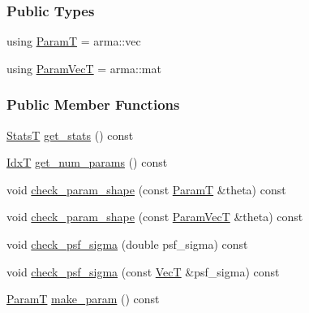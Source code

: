 \subsubsection*{Public Types}
\begin{DoxyCompactItemize}
\item 
using \hyperlink{classmappel_1_1PointEmitterModel_a665ec6aea3aac139bb69a23c06d4b9a1}{ParamT} = arma\+::vec
\item 
using \hyperlink{classmappel_1_1PointEmitterModel_add253b568d763f1513a810aac35de719}{Param\+VecT} = arma\+::mat
\end{DoxyCompactItemize}
\subsubsection*{Public Member Functions}
\begin{DoxyCompactItemize}
\item 
\hyperlink{namespacemappel_a04ab395b0cf82c4ce68a36b2212649a5}{StatsT} \hyperlink{classmappel_1_1PointEmitterModel_a7fd2b4b01b10bb6a493a39eb72d480cb}{get\+\_\+stats} () const 
\item 
\hyperlink{namespacemappel_ab17ec0f30b61ece292439d7ece81d3a8}{IdxT} \hyperlink{classmappel_1_1PointEmitterModel_a6fe8129bd24ab5c6620b3ab106b6c91a}{get\+\_\+num\+\_\+params} () const 
\item 
void \hyperlink{classmappel_1_1PointEmitterModel_a97a868e842302f670ed9f9bd49416771}{check\+\_\+param\+\_\+shape} (const \hyperlink{classmappel_1_1PointEmitterModel_a665ec6aea3aac139bb69a23c06d4b9a1}{ParamT} \&theta) const 
\item 
void \hyperlink{classmappel_1_1PointEmitterModel_a54b341a9bc0e32e2c8bbfe4ec0d8c9a1}{check\+\_\+param\+\_\+shape} (const \hyperlink{classmappel_1_1PointEmitterModel_add253b568d763f1513a810aac35de719}{Param\+VecT} \&theta) const 
\item 
void \hyperlink{classmappel_1_1PointEmitterModel_a01ce8d6358acbd2575be519dff1df89b}{check\+\_\+psf\+\_\+sigma} (double psf\+\_\+sigma) const 
\item 
void \hyperlink{classmappel_1_1PointEmitterModel_a85780ca544a5ef5e0a62e74005081677}{check\+\_\+psf\+\_\+sigma} (const \hyperlink{namespacemappel_a2225ad69f358daa3f4f99282a35b9a3a}{VecT} \&psf\+\_\+sigma) const 
\item 
\hyperlink{classmappel_1_1PointEmitterModel_a665ec6aea3aac139bb69a23c06d4b9a1}{ParamT} \hyperlink{classmappel_1_1PointEmitterModel_a1cd8ff64ce4132b6eaa8655696885749}{make\+\_\+param} () const 
\item 

\end{DoxyCompactItemize}
